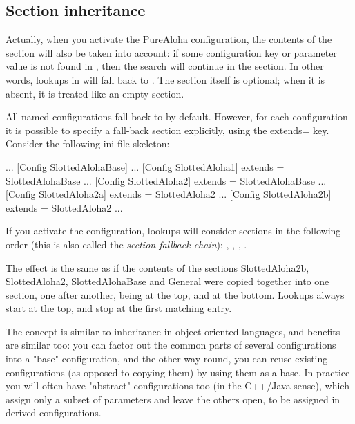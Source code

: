 \subsection{Section inheritance}

Actually, when you activate the PureAloha configuration, the contents of
the \ttt{[General]} section will also be taken into account: if some
configuration key or parameter value is not found in ,
then the search will continue in the \ttt{[General]} section. In
other words, lookups in  will fall back to \ttt{[General]}.
The \ttt{[General]} section itself is optional; when it is absent, it is
treated like an empty \ttt{[General]} section.

All named configurations fall back to \ttt{[General]} by default. However, for
each configuration it is possible to specify a fall-back section
explicitly, using the extends= key. Consider the following ini file
skeleton:

\begin{inifile}
[General]
...
[Config SlottedAlohaBase]
...
[Config SlottedAloha1]
extends = SlottedAlohaBase
...
[Config SlottedAloha2]
extends = SlottedAlohaBase
...
[Config SlottedAloha2a]
extends = SlottedAloha2
...
[Config SlottedAloha2b]
extends = SlottedAloha2
...
\end{inifile}


If you activate the  configuration, lookups will consider
sections in the following order (this is also called the
\textit{section fallback chain}): ,
, , .

The effect is the same as if the contents of the sections
SlottedAloha2b, SlottedAloha2, SlottedAlohaBase and General were copied
together into one section, one after another, 
being at the top, and \ttt{[General]} at the bottom. Lookups always start at
the top, and stop at the first matching entry.

The concept is similar to inheritance in object-oriented languages,
and benefits are similar too: you can factor out the common parts of
several configurations into a "base"
configuration, and the other way round, you can reuse existing
configurations (as opposed to copying them) by using them as a base. In
practice you will often have "abstract"
configurations too (in the C++/Java sense), which assign only a subset
of parameters and leave the others open, to be assigned in derived
configurations.

